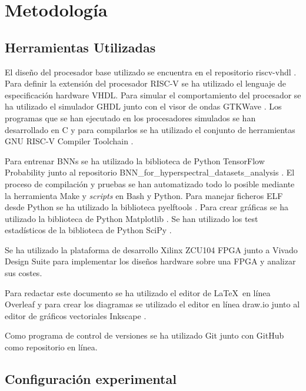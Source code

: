 \chapter{Metodología}

\section{Herramientas Utilizadas}

El diseño del procesador base utilizado se encuentra en el repositorio riscv-vhdl \cite{base_riscv_cpu_git}. Para definir la extensión del procesador RISC-V se ha utilizado el lenguaje de especificación hardware VHDL. Para simular el comportamiento del procesador se ha utilizado el simulador GHDL \cite{ghdl} junto con el visor de ondas GTKWave \cite{gtkwave}. Los programas que se han ejecutado en los procesadores simulados se han desarrollado en C y para compilarlos se ha utilizado el conjunto de herramientas GNU RISC-V Compiler Toolchain \cite{gcc_riscv}. 

Para entrenar BNNs se ha utilizado la biblioteca de Python TensorFlow Probability \cite{tfprob} junto al repositorio BNN\_for\_hyperspectral\_datasets\_analysis \cite{bnn_hyper_git}. El proceso de compilación y pruebas se han automatizado todo lo posible mediante la herramienta Make y \textit{scripts} en Bash y Python. Para manejar ficheros ELF desde Python se ha utilizado la biblioteca pyelftools \cite{pyelftools}. Para crear gráficas se ha utilizado la biblioteca de Python Matplotlib \cite{matplotlib}. Se han utilizado los test estadísticos de la biblioteca de Python SciPy \cite{scipy}.

Se ha utilizado la plataforma de desarrollo Xilinx ZCU104 FPGA \cite{fpga_board} junto a Vivado Design Suite \cite{vivado} para implementar los diseños hardware sobre una FPGA y analizar sus costes.

Para redactar este documento se ha utilizado el editor de \LaTeX\ en línea Overleaf \cite{overleaf} y para crear los diagramas se utilizado el editor en línea draw.io \cite{drawio} junto al editor de gráficos vectoriales Inkscape \cite{inkscape}.

Como programa de control de versiones se ha utilizado Git \cite{git} junto con GitHub \cite{github} como repositorio en línea.

\section{Configuración experimental}

